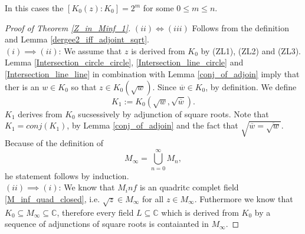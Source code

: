 
\begin{remark}
    In this cases the $[K_0(z):K_0] = 2^m$ for some $0 \le m \le n$.
\end{remark}
\begin{proof}[Proof of Theorem \ref{Z_in_Minf_1}]
    $(ii) \iff (iii)$ Follows from the definition and Lemma \ref{dergee2_iff_adjoint_sqrt}.\\
    $(i) \implies (ii)$: We assume that $z$ is derived from $K_0$ by (ZL1), (ZL2) and (ZL3). %
    Lemma \ref{Intersection_circle_circle}, \ref{Intersection_line_circle} and \ref{Intersection_line_line} in combination with Lemma \ref{conj_of_adjoin} 
    imply that ther is an $w \in K_0$ so that $z \in K_0(\sqrt{w})$. Since $\overline{w} \in K_0$, by definition. We define
    $$K_1 := K_0(\sqrt{w},\sqrt{\overline{w}}).$$
    $K_1$ derives from $K_0$ sucsessively by adjunction of square roots. Note that $K_1 = conj(K_1)$, by Lemma \ref{conj_of_adjoin} and the fact that $\sqrt{\overline{w} = \overline{\sqrt{w}}}$.
    Because of the definition of $$M_{\infty} = \bigcup_{n=0}^{\infty} M_n,$$
    he statement follows by induction.\\ %
    $(ii) \implies (i)$: We know that $M_inf$ is an quadritc complet field \ref{M_inf_quad_closed}, i.e. $\sqrt{z} \in M_{\infty}$ for all $z \in M_{\infty}$.
    Futhermore we know that $K_0\subseteq M_{\infty} \subseteq \mathbb{C}$, %
    therefore every field $L\subseteq \mathbb{C}$ which is derived from $K_0$ by a sequence of adjunctions of square roots is contaianted in $M_{\infty}$.
\end{proof}


